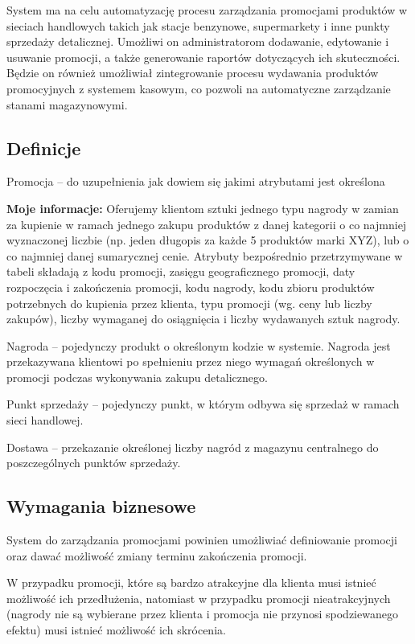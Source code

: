 \documentclass[a4paper,12pt]{article}
\begin{document}
System ma na celu automatyzację procesu zarządzania promocjami produktów w sieciach handlowych takich jak stacje benzynowe, supermarkety i inne punkty sprzedaży detalicznej.
Umożliwi on administratorom dodawanie, edytowanie i usuwanie promocji, a także generowanie raportów dotyczących ich skuteczności.
Będzie on również umożliwiał zintegrowanie procesu wydawania produktów promocyjnych z systemem kasowym, co pozwoli na automatyczne zarządzanie stanami magazynowymi.

\subsection*{Definicje}

Promocja -- do uzupełnienia jak dowiem się jakimi atrybutami jest określona

\textbf{Moje informacje:}
Oferujemy klientom sztuki jednego typu nagrody w zamian za kupienie w ramach jednego zakupu produktów z danej kategorii o co najmniej wyznaczonej liczbie (np. jeden długopis za każde 5 produktów marki XYZ), lub o co najmniej danej sumarycznej cenie.
Atrybuty bezpośrednio przetrzymywane w tabeli składają z kodu promocji, zasięgu geograficznego promocji, daty rozpoczęcia i zakończenia promocji, kodu nagrody, kodu zbioru produktów potrzebnych do kupienia przez klienta, typu promocji (wg. ceny lub liczby zakupów), liczby wymaganej do osiągnięcia i liczby wydawanych sztuk nagrody.

Nagroda -- pojedynczy produkt o określonym kodzie w systemie.
Nagroda jest przekazywana klientowi po spełnieniu przez niego wymagań określonych w promocji podczas wykonywania zakupu detalicznego.

Punkt sprzedaży -- pojedynczy punkt, w którym odbywa się sprzedaż w ramach sieci handlowej.

Dostawa -- przekazanie określonej liczby nagród z magazynu centralnego do poszczególnych punktów sprzedaży.

\subsection*{Wymagania biznesowe}

System do zarządzania promocjami powinien umożliwiać definiowanie promocji oraz dawać możliwość zmiany terminu zakończenia promocji.

W przypadku promocji, które są bardzo atrakcyjne dla klienta musi istnieć możliwość ich przedłużenia, natomiast w przypadku promocji nieatrakcyjnych (nagrody nie są wybierane przez klienta i promocja nie przynosi spodziewanego efektu) musi istnieć możliwość ich skrócenia.
\end{document}
